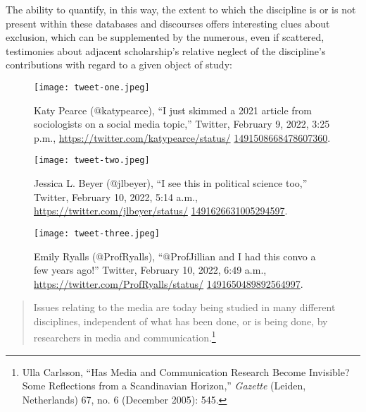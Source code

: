 \documentclass{tufte-handout}
\begin{document}
The ability to quantify, in this way, the extent to which the discipline
is or is not present within these databases and discourses offers
interesting clues about exclusion, which can be supplemented by the
numerous, even if scattered, testimonies about adjacent scholarship's
relative neglect of the discipline's contributions with regard to a
given object of study:

\begin{figure}
    \centering
    \texttt{[image: tweet-one.jpeg]}
    \caption{Katy Pearce (@katypearce), ``I just skimmed a 2021 article from sociologists on a social media topic,'' Twitter, February 9, 2022, 3:25 p.m., \href{https://twitter.com/katypearce/status/1491508668478607360?t=TVSnTHkyXjG6jGCvsLXbuw&s=03}{https://twitter.com/katypearce/status/} \href{https://twitter.com/katypearce/status/1491508668478607360}{1491508668478607360}.}
    \label{fig:one}
\end{figure}

\begin{figure}
    \centering
    \texttt{[image: tweet-two.jpeg]}
    \caption{Jessica L. Beyer (@jlbeyer), ``I see this in political science too,'' Twitter, February 10, 2022, 5:14 a.m., \href{https://twitter.com/jlbeyer/status/1491626631005294597}{https://twitter.com/jlbeyer/status/} \href{https://twitter.com/jlbeyer/status/1491626631005294597}{1491626631005294597}.}
    \label{fig:two}
\end{figure}


\begin{figure}
    \centering
    \texttt{[image: tweet-three.jpeg]}
    \caption{Emily Ryalls (@ProfRyalls), ``@ProfJillian and I had this convo a few years ago!'' Twitter, February 10, 2022, 6:49 a.m., \href{https://twitter.com/ProfRyalls/status/1491650489892564997}{https://twitter.com/ProfRyalls/status/} \href{https://twitter.com/ProfRyalls/status/1491650489892564997}{1491650489892564997}.}
    \label{fig:three}
\end{figure}

\begin{quote}
Issues relating to the media are today being studied in many different
disciplines, independent of what has been done, or is being done, by
researchers in media and communication.\footnote{Ulla Carlsson, ``Has
  Media and Communication Research Become Invisible? Some Reflections
  from a Scandinavian Horizon,'' \emph{Gazette} (Leiden, Netherlands)
  67, no. 6 (December 2005): 545.}
\end{quote}
\end{document}
